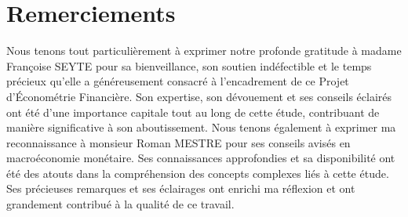 {\centering
\vspace*{\fill}
\section*{Remerciements}}
\begin{sloppypar}
  Nous tenons tout particulièrement à exprimer notre profonde gratitude à madame Françoise SEYTE pour sa bienveillance, son soutien indéfectible et le temps précieux qu'elle a généreusement consacré à l'encadrement de ce Projet d'Économétrie Financière. Son expertise, son dévouement et ses conseils éclairés ont été d'une importance capitale tout au long de cette étude, contribuant de manière significative à son aboutissement. Nous tenons également à exprimer ma reconnaissance à monsieur Roman MESTRE pour ses conseils avisés en macroéconomie monétaire. Ses connaissances approfondies et sa disponibilité ont été des atouts dans la compréhension des concepts complexes liés à cette étude. Ses précieuses remarques et ses éclairages ont enrichi ma réflexion et ont grandement contribué à la qualité de ce travail.  
\end{sloppypar}
\vspace*{\fill}
